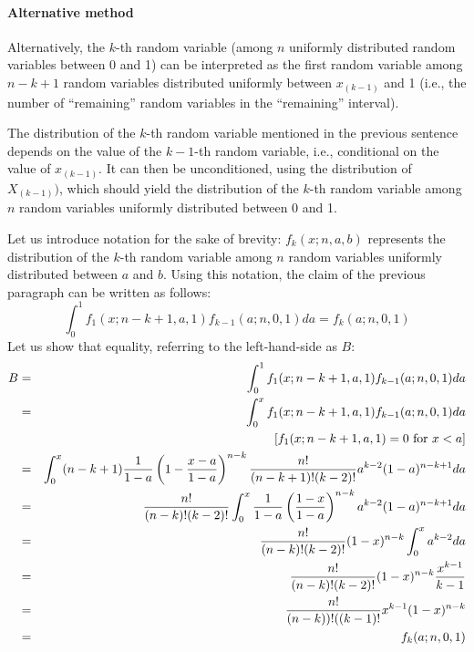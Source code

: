 \documentclass[12pt]{article} %
\begin{document}
\paragraph{Alternative method} Alternatively, the $k$-th random variable (among $n$ uniformly distributed random variables between 0 and 1) can be interpreted as the first random variable among $n-k+1$ random variables distributed uniformly between $x_{(k-1)}$ and 1 (i.e., the number of ``remaining'' random variables in the ``remaining'' interval).\par
The distribution of the $k$-th random variable mentioned in the previous sentence depends on the value of the $k-1$-th random variable, i.e., conditional on the value of $x_{(k-1)}$. It can then be unconditioned, using the distribution of $X_{(k-1)})$, which should yield the distribution of the $k$-th random variable among $n$ random variables uniformly distributed between 0 and 1.\par
Let us introduce notation for the sake of brevity: $f_k(x;n,a,b)$ represents the distribution of the $k$-th random variable among $n$ random variables uniformly distributed between $a$ and $b$. Using this notation, the claim of the previous paragraph can be written as follows:
\begin{equation}
\int_{0}^{1} f_1(x;n-k+1,a,1) f_{k-1}(a;n,0,1)da = f_k(a;n,0,1)
\end{equation}
Let us show that equality, referring to the left-hand-side as $B$:
\def\hs{\hspace{5em}}
\begin{eqnarray*}
B
& = & \int_{0}^{1} f_1(x;n-k+1,a,1) f_{k-1}(a;n,0,1)da \\
& = & \int_{0}^{x}  f_1(x;n-k+1,a,1) f_{k-1}(a;n,0,1)da \\
&   & \text{\hs[$f_1(x;n-k+1,a,1)=0$ for $x<a$]} \\
& = & \int_{0}^{x} (n-k+1)\frac{1}{1-a}\left(1-\frac{x-a}{1-a}\right)^{n-k} \frac{n!}{(n-k+1)!(k-2)!} a^{k-2} (1-a)^{n-k+1} da \\
& = & \frac{n!}{(n-k)!(k-2)!} \int_{0}^{x} \frac{1}{1-a} \left(\frac{1-x}{1-a}\right)^{n-k}  a^{k-2} (1-a)^{n-k+1} da \\
& = & \frac{n!}{(n-k)!(k-2)!} (1-x)^{n-k} \int_{0}^{x} a^{k-2} da \\
& = & \frac{n!}{(n-k)!(k-2)!} (1-x)^{n-k} \frac{x^{k-1}}{k-1} \\
& = & \frac{n!}{(n-k))!((k-1)!} x^{k-1} (1-x)^{n-k} \\
& = & f_k(a;n,0,1)
\end{eqnarray*}
%
%
\end{document}
